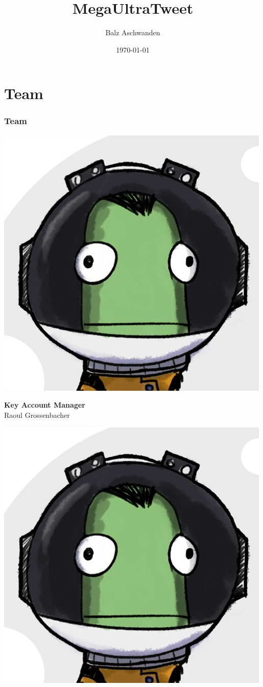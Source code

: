 \documentclass{beamer}
\title{MegaUltraTweet}
\author{Balz Aschwanden}
\date{\today}
\begin{document}
\frame{\titlepage} 

\section{Team}
\begin{frame}
  \frametitle{Team} \pause
  \begin{minipage}{.2\textwidth}
    \includegraphics[height=.2\textheight]{balz}
  \end{minipage}%
  \hfill
  \begin{minipage}{.8\textwidth}
    \textbf{Key Account Manager} \\ Raoul Grossenbacher \pause \\    
  \end{minipage}
  \begin{minipage}{.2\textwidth}
    \includegraphics[height=.2\textheight]{balz}

\end{minipage}
\end{frame}
\end{document}
